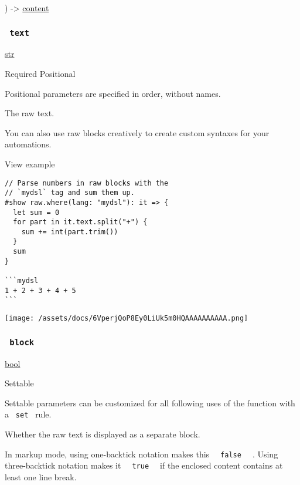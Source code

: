 ) -\textgreater{} \href{/docs/reference/foundations/content/}{content}

\subsubsection{\texorpdfstring{\texttt{\ text\ }}{ text }}\label{parameters-text}

\href{/docs/reference/foundations/str/}{str}

{Required} {{ Positional }}

\label{parameters-text-positional-tooltip}
Positional parameters are specified in order, without names.

The raw text.

You can also use raw blocks creatively to create custom syntaxes for
your automations.


View example

\begin{verbatim}
// Parse numbers in raw blocks with the
// `mydsl` tag and sum them up.
#show raw.where(lang: "mydsl"): it => {
  let sum = 0
  for part in it.text.split("+") {
    sum += int(part.trim())
  }
  sum
}

```mydsl
1 + 2 + 3 + 4 + 5
```
\end{verbatim}

\texttt{[image: /assets/docs/6VperjQoP8Ey0LiUk5m0HQAAAAAAAAAA.png]}

\subsubsection{\texorpdfstring{\texttt{\ block\ }}{ block }}\label{parameters-block}

\href{/docs/reference/foundations/bool/}{bool}

{{ Settable }}

\label{parameters-block-settable-tooltip}
Settable parameters can be customized for all following uses of the
function with a \texttt{\ set\ } rule.

Whether the raw text is displayed as a separate block.

In markup mode, using one-backtick notation makes this
\texttt{\ }{\texttt{\ false\ }}\texttt{\ } . Using three-backtick
notation makes it \texttt{\ }{\texttt{\ true\ }}\texttt{\ } if the
enclosed content contains at least one line break.

